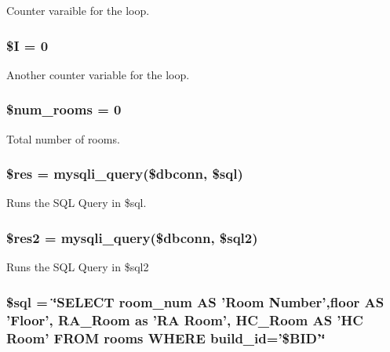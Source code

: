 \-Counter varaible for the loop. \hypertarget{upRoomsTable_8php_a46163db64b57db961d4bb2ada2d923f9}{
\subsubsection[{\$\-I}]{\setlength{\rightskip}{0pt plus 5cm}\$\-I = 0}}\label{upRoomsTable_8php_a46163db64b57db961d4bb2ada2d923f9}
\-Another counter variable for the loop. \hypertarget{upRoomsTable_8php_ad51cf907141b35051a8d4123b3e7e259}{
\subsubsection[{\$num\-\_\-rooms}]{\setlength{\rightskip}{0pt plus 5cm}\$num\-\_\-rooms = 0}}\label{upRoomsTable_8php_ad51cf907141b35051a8d4123b3e7e259}
\-Total number of rooms. \hypertarget{upRoomsTable_8php_a49a8a4009b02e49717caa88b128affc5}{
\subsubsection[{\$res}]{\setlength{\rightskip}{0pt plus 5cm}\$res = mysqli\-\_\-query(\$dbconn, \$sql)}}\label{upRoomsTable_8php_a49a8a4009b02e49717caa88b128affc5}
\-Runs the \-S\-Q\-L \-Query in \$sql. \hypertarget{upRoomsTable_8php_a3977504adc01ced790e56cece5e24b60}{
\subsubsection[{\$res2}]{\setlength{\rightskip}{0pt plus 5cm}\$res2 = mysqli\-\_\-query(\$dbconn, \$sql2)}}\label{upRoomsTable_8php_a3977504adc01ced790e56cece5e24b60}
\-Runs the \-S\-Q\-L \-Query in \$sql2 \hypertarget{upRoomsTable_8php_a047170d6020a882807665812a27e2525}{
\subsubsection[{\$sql}]{\setlength{\rightskip}{0pt plus 5cm}\$sql = \char`\"{}\-S\-E\-L\-E\-C\-T room\-\_\-num \-A\-S '\-Room \-Number',floor \-A\-S '\-Floor', \-R\-A\-\_\-\-Room as '\-R\-A \-Room', \-H\-C\-\_\-\-Room \-A\-S '\-H\-C \-Room' \-F\-R\-O\-M rooms \-W\-H\-E\-R\-E build\-\_\-id='\$\-B\-I\-D'\char`\"{}}}\label{upRoomsTable_8php_a047170d6020a882807665812a27e2525}
